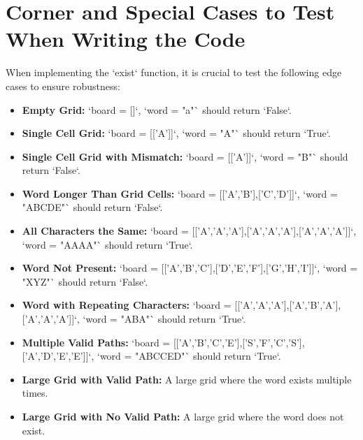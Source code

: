 \section*{Corner and Special Cases to Test When Writing the Code}

When implementing the `exist` function, it is crucial to test the following edge cases to ensure robustness:

\begin{itemize}
    \item \textbf{Empty Grid:} `board = []`, `word = "a"` should return `False`.
    
    \item \textbf{Single Cell Grid:} `board = [['A']]`, `word = "A"` should return `True`.
    
    \item \textbf{Single Cell Grid with Mismatch:} `board = [['A']]`, `word = "B"` should return `False`.
    
    \item \textbf{Word Longer Than Grid Cells:} `board = [['A','B'],['C','D']]`, `word = "ABCDE"` should return `False`.
    
    \item \textbf{All Characters the Same:} `board = [['A','A','A'],['A','A','A'],['A','A','A']]`, `word = "AAAA"` should return `True`.
    
    \item \textbf{Word Not Present:} `board = [['A','B','C'],['D','E','F'],['G','H','I']]`, `word = "XYZ"` should return `False`.
    
    \item \textbf{Word with Repeating Characters:} `board = [['A','A','A'],['A','B','A'],['A','A','A']]`, `word = "ABA"` should return `True`.
    
    \item \textbf{Multiple Valid Paths:} `board = [['A','B','C','E'],['S','F','C','S'],['A','D','E','E']]`, `word = "ABCCED"` should return `True`.
    
    \item \textbf{Large Grid with Valid Path:} A large grid where the word exists multiple times.
    
    \item \textbf{Large Grid with No Valid Path:} A large grid where the word does not exist.
\end{itemize}

\printindex